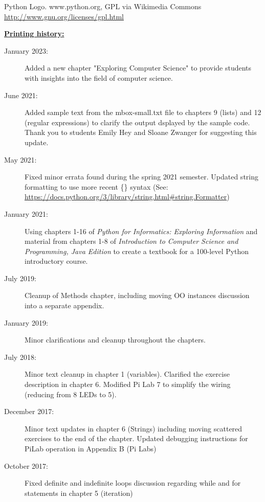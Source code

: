 \begin{latexonly}
{Python Logo. www.python.org, GPL via Wikimedia Commons
\newline
\url{http://www.gnu.org/licenses/gpl.html} 



\underline{\textbf{Printing history:}}

\begin{description}

\item[January 2023:] Added a new chapter "Exploring Computer Science" to provide students with insights into the field of computer science.
	
\item[June 2021:] Added sample text from the mbox-small.txt file to chapters 9 (lists) and 12 (regular expressions) to clarify the output dsplayed by the sample code. Thank you to students Emily Hey and Sloane Zwanger for suggesting this update.

\item[May 2021:] Fixed minor errata found during the spring 2021 semester. Updated string formatting to use more recent \{\} syntax (See: \url{https://docs.python.org/3/library/string.html\#string.Formatter})

\item[January 2021:] Using chapters 1-16 of \emph{Python for Informatics: Exploring Information} and material from chapters 1-8 of \emph{Introduction to Computer Science and Programming, Java Edition} to create a textbook for a 100-level Python introductory course.

\item[July 2019:] Cleanup of Methods chapter, including moving OO instances discussion into a separate appendix.

\item[January 2019:] Minor clarifications and cleanup throughout the chapters.

\item[July 2018:] Minor text cleanup in chapter 1 (variables). Clarified the exercise description in chapter 6. Modified Pi Lab 7 to simplify the wiring (reducing from 8 LEDs to 5).

\item[December 2017:] Minor text updates in chapter 6 (Strings) including moving scattered exercises to the end of the chapter. Updated debugging instructions for PiLab operation in Appendix B (Pi Labs)
	
\item[October 2017:] Fixed definite and indefinite loops discussion regarding while and for statements in chapter 5 (iteration)


\end{description}}
\end{latexonly}
